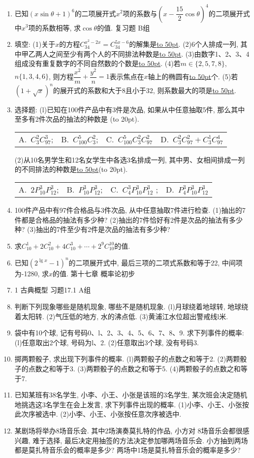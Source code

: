 \documentclass[10pt,a4paper]{article}
\newcommand{\blank}[1]{\underline{\hbox to #1pt{}}}
\newcommand{\bracket}[1]{(\hbox to #1pt{})}
\newcommand{\fourch}[4]{\par\begin{tabular}{p{.23\textwidth}p{.23\textwidth}p{.23\textwidth}p{.23\textwidth}}
A.~#1 &B.~#2& C.~#3& D.~#4
\end{tabular}}
\begin{document}
\begin{enumerate}[1.]
\item 已知$(x\sin \theta +1)^6$的二项展开式$x^2$项的系数与$(x-\dfrac{15}2\cos \theta)^4$的二项展开式中$x^3$项的系数相等, 求$\cos \theta$的值.
复习题
B组
\item 填空:
(1)关于$x$的方程$C_{34}^{x^2-2x}=C_{34}^{5x-6}$的解集是\blank{50}.
(2)6个人排成一列, 其中甲乙两人之间至少有两个人的不同排法种数是\blank{50}.
(3)由数字1、2、3、4组成没有重复数字的不同自然数的个数是\blank{50}.
(4)若$m\in \{2,5,7,8\}$, $n\{1,3,4,6\}$, 则方程$\dfrac{x^2}m+\dfrac{y^2}n=1$表示焦点在$x$轴上的椭圆有\blank{50}个.
(5)若$(1+\sqrt x)^n$的展开式的系数和大于$8$且小于$32$, 则系数最大的项是\blank{50}.
\item 选择题:
(l)已知在100件产品中有3件是次品, 如果从中任意抽取5件, 那么其中至多有2件次品的抽法的种数是 \bracket{20}.
\fourch{$C_3^2C_{97}^3$;}{$C_{100}^5C_3^2$;}{$C_{100}^5C_3^2C_{97}^2$}{$C_3^2C_{97}^2+C_3^1C_{97}^4$}
(2)从10名男学生和12名女学生中各选3名排成一列, 其中男、女相间排成一列的不同排法的种数是\blank{50}\bracket{20}.
\fourch{$2P_{10}^3P_{12}^3$;}{$P_{10}^3P_{12}^3$;}{$C_4^3P_{10}^3P_{12}^3$ ;}{$P_4^3P_{10}^3P_{12}^3$}
\item 100件产品中有97件合格品与3件次品, 从中任意抽取7件进行检查.
(1)抽出的7件都是合格品的抽法有多少种?
(2)抽出的7件恰好有2件是次品的抽法有多少种?
(3)抽出的7件至少有2件是次品的抽法有多少种?
\item 求$C_{10}^1+2C_{10}^2+4C_{10}^3+\cdots +2^9C_{10}^{10}$的值.
\item 已知$(2^{\lg x}-1)^n$的二项展开式中, 最后三项的二项式系数和等于22, 中间项为-1280, 求$x$的值.
第十七章  概率论初步
\item 1  古典概型
习题17.1  A组
\item 判断下列现象哪些是随机现象, 哪些不是随机现象.
(l)月球绕着地球转, 地球绕着太阳转.
(2)气压低的地方, 水的沸点低.
(3)黄浦江水位超出警戒线l米.
\item 袋中有10个球, 记有号码0、l、2、3、4、5、6、7、8、9. 求下列事件的概率:
(l)任意取出2个球, 号码为l、2.
(2)任意取出3个球, 没有号码3.
\item 掷两颗骰子, 求出现下列事件的概率.
(l)两颗骰子的点数之和等于2.
(2)两颗骰子的点数之和等于3.
(3)两颗骰子的点数之和等于5.
(4)两颗骰子的点数之和等于7.
\item 已知某班有38名学生, 小李、小王、小张是该班的3名学生, 某次班会决定随机地挑选这3名学生在会上发言, 求下列事件出现的概率.
(1)小李、小王、小张按此次序被选中.
(2)小李、小王、小张按任意次序被选中.
\item 某剧场将举办8场音乐会. 其中2场演奏莫扎特的作品, 小方对 8场音乐会都很感兴趣, 难于选择, 最后决定用抽签的方法决定参加哪两场音乐会. 小方抽到两场都是莫扎特音乐会的概率是多少? 两场中1场是莫扎特音乐会的概率是多少?

\end{enumerate}
\end{document}

